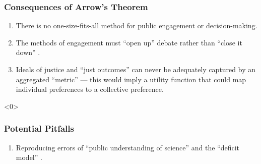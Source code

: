 \begin{frame}
    \frametitle{Consequences of Arrow's Theorem}

    \begin{enumerate}
        \item There is no one-size-fits-all method for public engagement or
        decision-making.
        \item The methods of engagement must ``open up'' debate rather than
        ``close it down'' \cite{wilsdon_see-through_2004,dryzek_deliberative_2013}. 
        \item Ideals of justice and ``just outcomes'' can never be adequately
        captured by an aggregated ``metric'' --- this would imply a utility
        function that could map individual preferences to a collective
        preference.
    \end{enumerate}

\end{frame}

\begin{frame}<0>
    \frametitle{Potential Pitfalls}

    \begin{enumerate}
        \item Reproducing errors of ``public understanding of science'' and the
        ``deficit model'' \cite{wynne_misunderstood_1992,wynne_public_2006}.
    \end{enumerate}

\end{frame}




